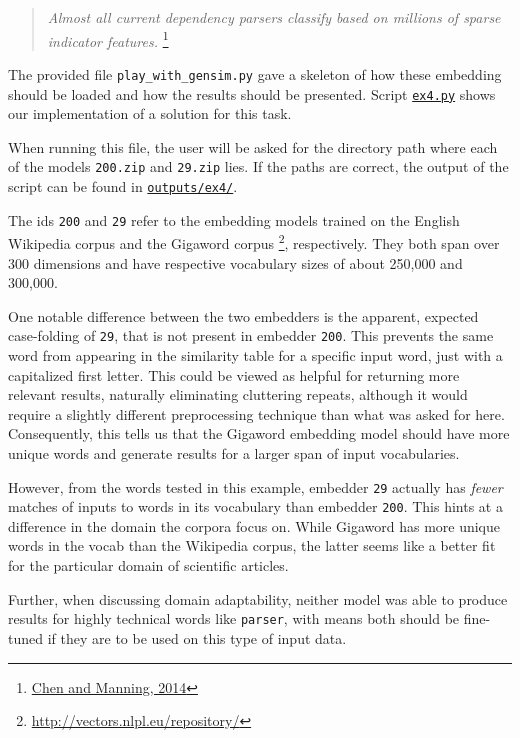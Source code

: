 \begin{quote}
    \textit{Almost all current dependency parsers classify based on millions of sparse indicator features.} \footnote{\href{https://www.aclweb.org/anthology/D14-1082.pdf}{Chen and Manning, 2014}}
\end{quote}

The provided file \texttt{play\_with\_gensim.py} gave a skeleton of how these embedding should be loaded and how the results should be presented. 
Script \texttt{\href{https://github.uio.no/fabior/IN5550/blob/master/Oblig2/ex4.py}{ex4.py}} shows our implementation of a solution for this task. 

When running this file, the user will be asked for the directory path where each of the models \texttt{200.zip} and \texttt{29.zip} lies. If the paths are correct, the output of the script can be found in \texttt{\href{https://github.uio.no/fabior/IN5550/blob/master/Oblig2/outptus/ex4/}{outputs/ex4/}}. 

The ids \texttt{200} and \texttt{29} refer to the embedding models trained on the English Wikipedia corpus and the Gigaword corpus 
\footnote{\href{http://vectors.nlpl.eu/repository/}{http://vectors.nlpl.eu/repository/}},
respectively. They both span over 300 dimensions and have respective vocabulary sizes of about 250,000 and 300,000. 

One notable difference between the two embedders is the apparent, expected case-folding of \texttt{29}, that is not present in embedder \texttt{200}. This prevents the same word from appearing in the similarity table for a specific input word, just with a capitalized first letter. This could be viewed as helpful for returning more relevant results, naturally eliminating cluttering repeats, although it would require a slightly different preprocessing technique than what was asked for here. Consequently, this tells us that the Gigaword embedding model should have more unique words and generate results for a larger span of input vocabularies. 

However, from the words tested in this example, embedder \texttt{29} actually has \textit{fewer} matches of inputs to words in its vocabulary than embedder \texttt{200}. This hints at a difference in the domain the corpora focus on.  While Gigaword has more unique words in the vocab than the Wikipedia corpus, the latter seems like a better fit for the particular domain of scientific articles. 

Further, when discussing domain adaptability, neither model was able to produce results for highly technical words like \texttt{parser}, with means both should be fine-tuned if they are to be used on this type of input data.  


